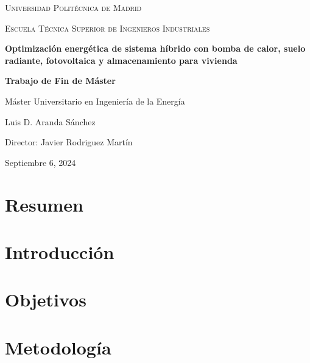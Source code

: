 \documentclass[a4paper,11pt,twoside]{report}
\begin{document}
\begin{titlepage}
    \centering
    {\scshape\LARGE Universidad Politécnica de Madrid \par}
    \vspace{1cm}
    {\scshape\Large Escuela Técnica Superior de Ingenieros Industriales\par}
    \vspace{1.5cm}
    {\huge\bfseries Optimización energética de sistema híbrido con bomba de calor, suelo radiante, fotovoltaica y almacenamiento para vivienda \par}
    \vspace{1.5cm}
    {\Large\bfseries Trabajo de Fin de Máster\par}
    \vspace{0.5cm}
    {\large Máster Universitario en Ingeniería de la Energía \par}
    \vspace{2cm}
    {\Large Luis D. Aranda Sánchez\par}
    \vfill
    Director: Javier Rodriguez Martín
    \vfill
    {\large Septiembre 6, 2024\par}
\end{titlepage}

\clearpage
\pagestyle{simple}
\chapter*{Resumen}


\clearpage
\pagestyle{simple}
\tableofcontents

\clearpage
\pagestyle{myfancy}
\newpage
\chapter{Introducción}


\chapter{Objetivos}


\chapter{Metodología}

\end{document}
